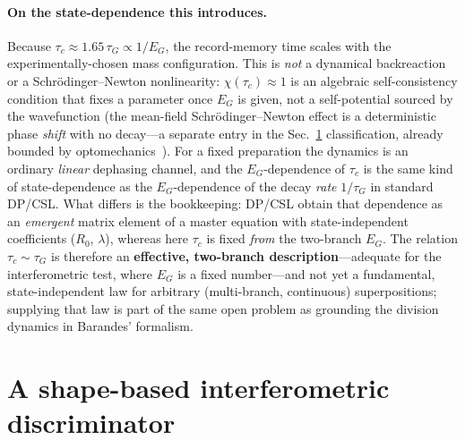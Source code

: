 \documentclass[aps,prd,onecolumn,amsmath,amssymb,nofootinbib,superscriptaddress]{revtex4-2}
\begin{document}
\paragraph{On the state-dependence this introduces.} Because $\tau_c\approx1.65\,\tau_G\propto1/E_G$,
the record-memory time scales with the experimentally-chosen mass configuration. This is \emph{not} a
dynamical backreaction or a Schr\"odinger--Newton nonlinearity: $\chi(\tau_c)\approx1$ is an algebraic
self-consistency condition that fixes a parameter once $E_G$ is given, not a self-potential sourced by
the wavefunction (the mean-field Schr\"odinger--Newton effect is a deterministic phase \emph{shift}
with no decay---a separate entry in the Sec.~\ref{sec:disc} classification, already bounded by
optomechanics~\cite{R24}). For a fixed preparation the dynamics is an ordinary \emph{linear} dephasing
channel, and the $E_G$-dependence of $\tau_c$ is the same kind of state-dependence as the
$E_G$-dependence of the decay \emph{rate} $1/\tau_G$ in standard DP/CSL. What differs is the
bookkeeping: DP/CSL obtain that dependence as an \emph{emergent} matrix element of a master equation
with state-independent coefficients ($R_0$, $\lambda$), whereas here $\tau_c$ is fixed \emph{from} the
two-branch $E_G$. The relation $\tau_c\sim\tau_G$ is therefore an \textbf{effective, two-branch
description}---adequate for the interferometric test, where $E_G$ is a fixed number---and not yet a
fundamental, state-independent law for arbitrary (multi-branch, continuous) superpositions; supplying
that law is part of the same open problem as grounding the division dynamics in Barandes' formalism.

\section{A shape-based interferometric discriminator}\label{sec:disc}
\end{document}
